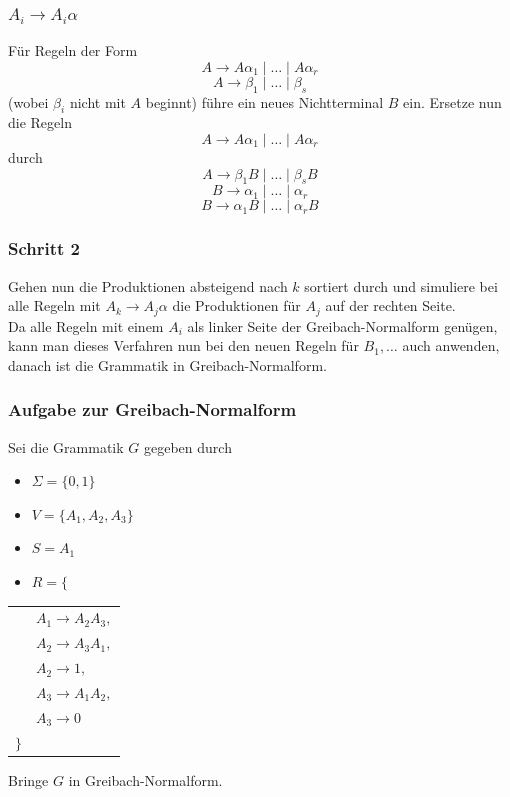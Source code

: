 \begin{frame}
\frametitle{$A_i \rightarrow A_i\alpha$}
Für Regeln der Form 
$$A \rightarrow A\alpha_1 \mid \ldots \mid A\alpha_r$$
$$A \rightarrow \beta_1 \mid \ldots \mid \beta_s$$
(wobei $\beta_i$ nicht mit $A$ beginnt) führe ein neues Nichtterminal $B$ ein. Ersetze nun die Regeln
$$A \rightarrow A\alpha_1 \mid \ldots \mid A\alpha_r$$
durch
$$A \rightarrow \beta_1B \mid \ldots \mid \beta_sB$$
$$B \rightarrow \alpha_1 \mid \ldots \mid \alpha_r$$
$$B \rightarrow \alpha_1B \mid \ldots \mid \alpha_rB$$
\end{frame}

\begin{frame}
 \frametitle{Schritt 2}
Gehen nun die Produktionen absteigend nach $k$ sortiert durch und simuliere bei alle Regeln mit $A_k \rightarrow A_j\alpha$ die Produktionen für $A_j$ auf der rechten Seite.\\
Da alle Regeln mit einem $A_i$ als linker Seite der Greibach-Normalform genügen, kann man dieses Verfahren nun bei den neuen Regeln für $B_1,\ldots$ auch anwenden, danach ist die Grammatik in Greibach-Normalform.
\end{frame}

\begin{frame}
\frametitle{Aufgabe zur Greibach-Normalform}
Sei die Grammatik $G$ gegeben durch
\begin{itemize}
 \item $\Sigma = \{0, 1\}$
 \item $V = \{A_1, A_2, A_3\}$
 \item $S = A_1$
 \item $R = \{$
\end{itemize}

\begin{tabular}{ll}
 	 & $A_1 \rightarrow A_2A_3,$ \\
 	& $A_2 \rightarrow A_3A_1,$ \\
 	&	$A_2 \rightarrow 1,$ \\
 	&	$A_3 \rightarrow A_1A_2,$ \\
 	& $A_3 \rightarrow 0$ \\
 	$ \}$ &
 	\end{tabular}
 	
\ducttape{1cm}

Bringe $G$ in Greibach-Normalform.
\end{frame}

